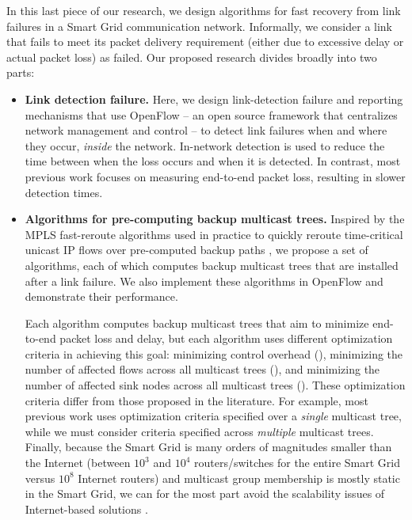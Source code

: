 In this last piece of our research, we design algorithms for fast recovery from link failures in a Smart Grid communication network. 
Informally, we consider a link that fails to meet its packet delivery requirement (either due to excessive delay or actual packet loss) as failed.  Our proposed research divides broadly into two parts:
\vspace{-0.3cm}
\begin{itemize}
	
	\item {\bf Link detection failure.} 
		Here, we design link-detection failure and reporting mechanisms that use OpenFlow  \cite{OpenFlow08} -- an open source framework that centralizes network management and control -- 
		to detect link failures when and where they occur, \emph{inside} the network.  In-network detection is used to reduce the time between when the loss occurs and when it is detected. 
		In contrast, most previous work \cite{badbing,ping,zing} focuses on measuring end-to-end packet loss, resulting in slower detection times. 

	\item {\bf Algorithms for pre-computing backup multicast trees.} 
		Inspired by the MPLS fast-reroute algorithms used in practice to quickly reroute time-critical unicast IP flows over pre-computed backup paths \cite{Cui04,Fei01,Medard99,Pointurier02,Wu97}, 
		we propose a set of algorithms, each of which computes backup multicast trees that are installed after a link failure. We also implement these algorithms in OpenFlow and demonstrate their performance.
		
		Each algorithm computes backup multicast trees that aim to minimize end-to-end packet loss and delay, but each algorithm uses different optimization criteria in achieving this goal: minimizing control overhead (\mcs), minimizing 
		the number of affected flows across all multicast trees (\mfs),
   		and minimizing the number of affected sink nodes across all multicast trees (\mds).  These optimization criteria differ from those proposed in the literature.
		For example, most previous work \cite{Cui04,Fei01,Medard99,Pointurier02,Wu97} uses optimization criteria specified over a \emph{single} multicast tree, while we must consider 
		criteria specified across \emph{multiple} multicast trees. Finally, because the Smart Grid is many orders of magnitudes smaller than the Internet (between $10^3$ and $10^4$ routers/switches for the entire Smart Grid versus $10^8$ Internet routers) 
		and multicast group membership is mostly static in the Smart Grid, we can for the most part avoid the scalability issues of Internet-based
		solutions \cite{Cui04,Fei01,Medard99,Pointurier02,Wu97}.

\end{itemize}
\vspace{-0.3cm}


